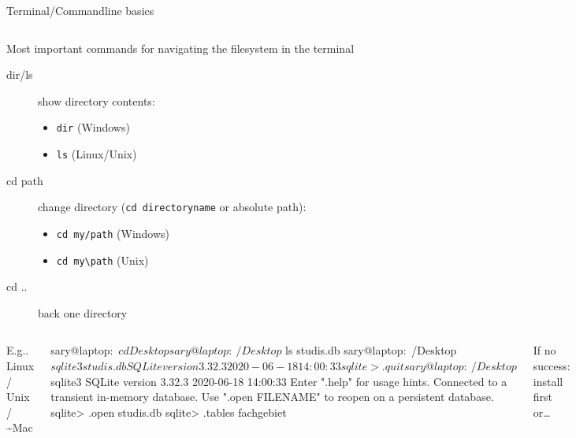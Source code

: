 \begin{frame}{Terminal/Commandline basics}
\begin{columns}
\begin{alertblock}{Most important commands for navigating the filesystem in the terminal}
\begin{description}
    \item[dir/ls] show directory contents:
    \begin{itemize}\footnotesize
    \item \texttt{dir} (Windows)
    \item \texttt{ls} (Linux/Unix)\end{itemize}
    \item[cd path] change directory (\texttt{cd directoryname} or absolute path):
    \begin{itemize}\footnotesize
    \item \texttt{cd my/path} (Windows)
    \item \verb|cd my\path| (Unix)
    \end{itemize} 
    \item[cd ..] back one directory
\end{description}
\end{alertblock}
\end{columns}


\framebreak

\begin{columns}

E.g.. Linux / Unix / \textasciitilde Mac
\begin{shell-sessioncode}
sary@laptop:~$ cd Desktop
sary@laptop:~/Desktop$ ls
 studis.db 
sary@laptop:~/Desktop$ sqlite3 studis.db
SQLite version 3.32.3 2020-06-18 14:00:33
sqlite> .quit
sary@laptop:~/Desktop$ sqlite3 
SQLite version 3.32.3 2020-06-18 14:00:33
Enter ".help" for usage hints.
Connected to a transient in-memory database.
Use ".open FILENAME" to reopen on a
persistent database.
sqlite> .open studis.db
sqlite> .tables
fachgebiet
\end{shell-sessioncode}

If no success: install first or\dots 
\begin{shell-sessioncode}
sary@laptop:~/Desktop$ which sqlite3
/home/oem/anaconda3/bin/sqlite3
sary@laptop:~/Desktop$ sqlite3 -version
3.32.3 2020-06-18 14:00:33 ...
\end{shell-sessioncode}


E.g. Windows

\begin{block}{Search: `Terminal/cmd'}
Show contents of currenct directory
\begin{shell-sessioncode}
C:\> dir
 Datenträger in Laufwerk C: 
 ist System ....
 Verzeichnis von C:.2022 14:22 <DIR> sarah
 22.03.2022 10:07 <DIR> test
\end{shell-sessioncode}


\end{block}
\end{columns}
\end{frame}
